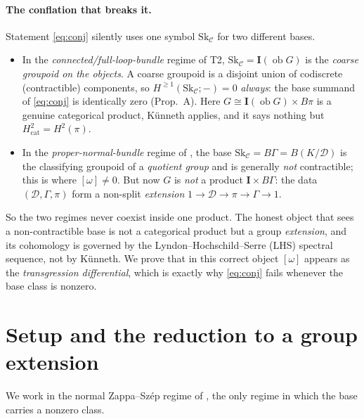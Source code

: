 \documentclass[11pt]{article}
\theoremstyle{definition}
\newcommand{\ob}{\operatorname{ob}}
\newcommand{\Sk}{\mathrm{Sk}}
\newcommand{\C}{\mathcal{C}}
\newcommand{\D}{\mathcal{D}}
\newcommand{\Igp}{\mathbf{I}}
\newcommand{\Bpi}{B\pi}
\begin{document}
\paragraph{The conflation that breaks it.} Statement \eqref{eq:conj} silently
uses one symbol $\Sk_\C$ for two different bases.
\begin{itemize}
\item In the \emph{connected/full-loop-bundle} regime of T2, $\Sk_\C=\Igp(\ob G)$
is the \emph{coarse groupoid on the objects}. A coarse groupoid is a disjoint
union of codiscrete (contractible) components, so $H^{\ge1}(\Sk_\C;-)=0$
\emph{always}: the base summand of \eqref{eq:conj} is identically zero
(Prop.~A). Here $G\cong\Igp(\ob G)\times\Bpi$ is a genuine categorical product,
Künneth applies, and it says nothing but $H^2_{\mathrm{cat}}=H^2(\pi)$.
\item In the \emph{proper-normal-bundle} regime of \cite{gzs}, the base
$\Sk_\C=B\Gamma=B(K/\D)$ is the classifying groupoid of a \emph{quotient group}
and is generally \emph{not} contractible; this is where $[\omega]\neq0$. But now
$G$ is \emph{not} a product $\Igp\times B\Gamma$: the data
$(\D,\Gamma,\pi)$ form a non-split \emph{extension} $1\to\D\to\pi\to\Gamma\to1$.
\end{itemize}
So the two regimes never coexist inside one product. The honest object that
sees a non-contractible base is not a categorical product but a group
\emph{extension}, and its cohomology is governed by the
Lyndon--Hochschild--Serre (LHS) spectral sequence, not by Künneth. We prove that
in this correct object $[\omega]$ appears as the \emph{transgression
differential}, which is exactly why \eqref{eq:conj} fails whenever the base
class is nonzero.

\section{Setup and the reduction to a group extension}

We work in the normal Zappa--Sz\'ep regime of \cite{gzs}, the only regime in
which the base carries a nonzero class.
\end{document}
